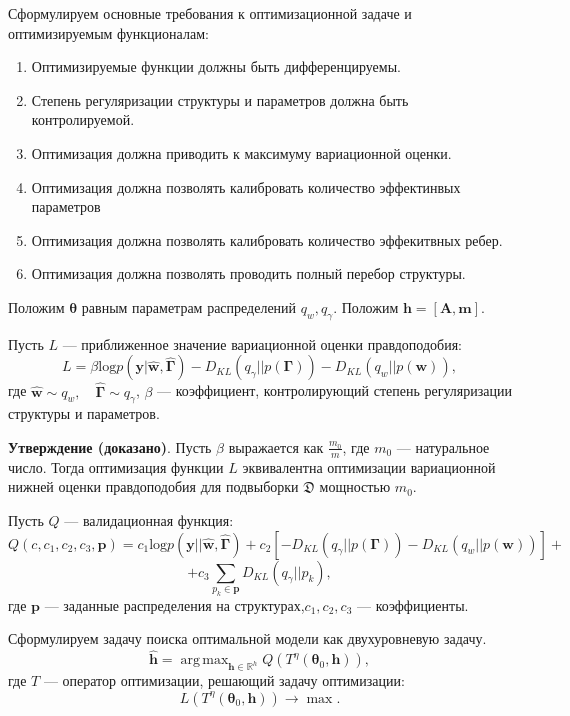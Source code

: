 \documentclass[12pt]{article}
\DeclareMathOperator*{\argmax}{arg\,max}
\begin{document}
Сформулируем основные требования к оптимизационной задаче и оптимизируемым функционалам:
\begin{enumerate}
\item Оптимизируемые функции должны быть дифференцируемы.
\item Степень регуляризации структуры и параметров должна быть контролируемой.
\item Оптимизация должна приводить к максимуму вариационной оценки.
\item Оптимизация должна позволять калибровать количество эффектинвых параметров
\item Оптимизация должна позволять калибровать количество эффекитвных ребер.
\item Оптимизация должна позволять проводить полный перебор структуры.
\end{enumerate}

Положим $\boldsymbol{\theta}$ равным параметрам распределений $q_w, q_\gamma$. 
Положим $\mathbf{h} = [\mathbf{A}, \mathbf{m}].$

Пусть $L$ --- приближенное значение вариационной оценки правдоподобия:
\[
    L = \beta\text{log} p(\mathbf{y}|\hat{\mathbf{w}}, \hat{\boldsymbol{\Gamma}}) - {D_{KL}}(q_\gamma||p(\boldsymbol{\Gamma})) - {D_{KL}}(q_{w}||p(\mathbf{w})),
\]
где $\hat{\mathbf{w}} \sim q_w, \quad \hat{\boldsymbol{\Gamma}} \sim q_\gamma$, $\beta$ --- коэффициент, контролирующий степень регуляризации структуры и параметров.

\textbf{Утверждение (доказано)}. Пусть $\beta$ выражается как $\frac{m_0}{m}$, где $m_0$ --- натуральное число.
Тогда оптимизация функции $L$ эквивалентна оптимизации вариационной нижней оценки правдоподобия для подвыборки  $\mathfrak{D}$ 
мощностью $m_0$.

Пусть $Q$ --- валидационная функция:
\[
    Q(c, c_1, c_2, c_3, \mathbf{p}) = c_1\text{log} p(\mathbf{y}||\hat{\mathbf{w}}, \hat{\boldsymbol{\Gamma}}) + c_2[-{D_{KL}}(q_\gamma||p(\boldsymbol{\Gamma})) - {D_{KL}}(q_{w}||p(\mathbf{w}))] + 
\]
\[
    + c_3\sum_{p_k \in \mathbf{p}}{D_{KL}}(q_\gamma||p_k),
\]
где $\mathbf{p}$ --- заданные распределения на структурах,$c_1,c_2,c_3$ --- коэффициенты.

Сформулируем задачу поиска оптимальной модели как двухуровневую задачу.
\begin{equation}
\label{eq:optim}
	\hat{\mathbf{h}} = \argmax_{\mathbf{h} \in \mathbb{R}^h} Q( T^\eta(\boldsymbol{\theta}_0, \mathbf{h})),
\end{equation}
где $T$ --- оператор оптимизации, решающий задачу оптимизации:
\[
    L(T^\eta(\boldsymbol{\theta}_0, \mathbf{h})) \to \max.
\]
\end{document}
